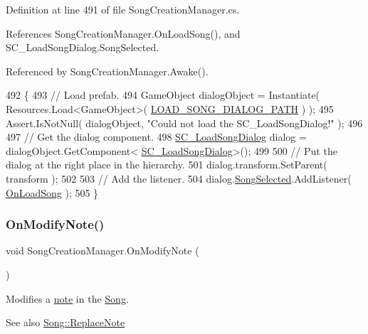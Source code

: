 Definition at line 491 of file Song\+Creation\+Manager.\+cs.



References Song\+Creation\+Manager.\+On\+Load\+Song(), and S\+C\+\_\+\+Load\+Song\+Dialog.\+Song\+Selected.



Referenced by Song\+Creation\+Manager.\+Awake().


\begin{DoxyCode}
492     \{
493         \textcolor{comment}{// Load prefab.}
494         GameObject dialogObject = Instantiate( Resources.Load<GameObject>( 
      \hyperlink{group___s_c_m_const_ga821945ef78c5b9411d7861b42407591e}{LOAD\_SONG\_DIALOG\_PATH} ) );
495         Assert.IsNotNull( dialogObject, \textcolor{stringliteral}{"Could not load the SC\_LoadSongDialog!"} );
496 
497         \textcolor{comment}{// Get the dialog component.}
498         \hyperlink{class_s_c___load_song_dialog}{SC\_LoadSongDialog} dialog = dialogObject.GetComponent<
      \hyperlink{class_s_c___load_song_dialog}{SC\_LoadSongDialog}>();
499 
500         \textcolor{comment}{// Put the dialog at the right place in the hierarchy.}
501         dialog.transform.SetParent( transform );
502 
503         \textcolor{comment}{// Add the listener.}
504         dialog.\hyperlink{group___s_c___l_s_d_events_ga48d606b2c8291fee822dcc2b14ddcecc}{SongSelected}.AddListener( \hyperlink{group___s_c_m_handlers_gae3791e700c2e12f1dd705c4b951ec260}{OnLoadSong} );
505     \}
\end{DoxyCode}
\mbox{\label{group___s_c_m_handlers_gaf12d6326ad2175a51f688504372be784}} 
\subsubsection{\texorpdfstring{On\+Modify\+Note()}{OnModifyNote()}}
{\footnotesize\ttfamily void Song\+Creation\+Manager.\+On\+Modify\+Note (\begin{DoxyParamCaption}{ }\end{DoxyParamCaption})}



Modifies a \hyperlink{group___music_structs_struct_music_1_1_combined_note}{note} in the \hyperlink{class_song}{Song}. 

\begin{DoxySeeAlso}{See also}
\hyperlink{group___song_pub_func_ga326d61c75339080057a02c6decb0cde3}{Song\+::\+Replace\+Note} 
\end{DoxySeeAlso}


